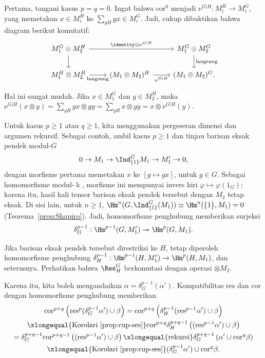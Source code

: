 \begin{bukti}
	Pertama, tangani kasus $p=q=0$. Ingat bahwa $\mathrm{cor}^0$ menjadi
	$\nu^{G|H}:M_i^H\to M_i^G$, yang memetakan $x\in M_i^H$ ke
	$\sum_{gH}gx\in M_i^G$. Jadi, cukup dibuktikan bahwa diagram berikut
	komutatif:
	\[\begin{tikzcd}
		M_1^G \otimes M_2^H \arrow[rr, "{\identity \otimes \nu^{G|H}}"] \arrow[d] & & M_1^G \otimes M_2^G \arrow[d, "\text{langsung}"] \\
		M_1^H \otimes M_2^H \arrow[r, "\text{langsung}"'] & (M_1 \otimes M_2)^H \arrow[r, "{\nu^{G|H}}"'] & (M_1 \otimes M_2)^G .
	\end{tikzcd}\]

	Hal ini sangat mudah. Jika $x\in M_1^G$ dan $y\in M_2^H$, maka
	$\nu^{G|H}(x\otimes y)=\sum_{gH}gx\otimes gy
	=\sum_{gH}x\otimes gy=x\otimes\nu^{G|H}(y)$.

	Untuk kasus $p\geq1$ atau $q\geq1$, kita menggunakan pergeseran dimensi dan
	argumen rekursif. Sebagai contoh, ambil kasus $p\geq1$ dan tinjau barisan
	eksak pendek modul-$G$
	\[ 0 \to M_1 \to \Ind^G_{\{1\}} M_1 \to M'_1 \to 0, \]
	dengan morfisme pertama memetakan $x$ ke $[g\mapsto gx]$, untuk $g\in G$.
	Sebagai homomorfisme modul-$\Bbbk$, morfisme ini mempunyai invers kiri
	$\varphi\mapsto\varphi(1_G)$; karena itu, hasil kali tensor barisan eksak
	pendek tersebut dengan $M_2$ tetap eksak. Di sisi lain, untuk $n\geq1$,
	$\Hm^n(G,\Ind^G_{\{1\}}(M_1))\simeq\Hm^n(\{1\},M_1)=0$
(Teorema~\ref{prop:Shapiro}). Jadi, homomorfisme penghubung memberikan
surjeksi
	\[ \delta_G^{p-1}: \Hm^{p-1}(G, M'_1) \twoheadrightarrow \Hm^p(G, M_1). \]

	Jika barisan eksak pendek tersebut direstriksi ke $H$, tetap diperoleh
	homomorfisme penghubung
	$\delta_H^{p-1}:\Hm^{p-1}(H,M'_1)\to\Hm^p(H,M_1)$, dan seterusnya.
	Perhatikan bahwa $\Res^G_H$ berkomutasi dengan operasi $\otimes M_2$.

	Karena itu, kita boleh mengandaikan
	$\alpha=\delta_G^{p-1}(\alpha')$. Kompatibilitas $\mathrm{res}$ dan
	$\mathrm{cor}$ dengan homomorfisme penghubung memberikan
	\begin{multline*}
		\mathrm{cor}^{p+q}\left( \mathrm{res}^p(\delta_G^{p-1} \alpha') \cup \beta \right) = \mathrm{cor}^{p+q}\left( \delta_H^{p-1} (\mathrm{res}^{p-1} \alpha') \cup \beta \right) \\
		\xlongequal{\text{Korolari \ref{prop:cup-ses}}} \mathrm{cor}^{p+q} \delta_H^{p+q-1} \left( (\mathrm{res}^{p-1} \alpha') \cup \beta \right) \\
		= \delta^{p+q-1}_G \mathrm{cor}^{p+q-1} \left( (\mathrm{res}^{p-1} \alpha') \cup \beta \right)
		\xlongequal{\text{rekursi}} \delta^{p+q-1}_G \left(\alpha' \cup \mathrm{cor}^q \beta\right) \\
		\xlongequal{\text{Korolari \ref{prop:cup-ses}}} (\delta^{p-1}_G \alpha') \cup \mathrm{cor}^q \beta .
	\end{multline*}


\end{bukti}
